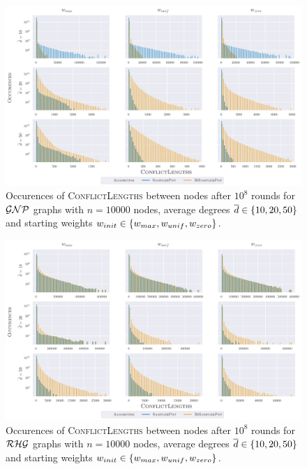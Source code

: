 \begin{figure}
  \centering
  \includegraphics[width=\textwidth]{Figures/experiments/NodeConflicts_Gnp.pdf}
  \caption{
    Occurences of \textsc{ConflictLengths} between nodes after $10^8$ rounds for $\mathcal{GNP}$ graphs with $n = 10000$ nodes, average degrees $\overline{d} \in \left\{10, 20, 50\right\}$ and starting weights $w_{init} \in \left\{w_{max}, w_{unif}, w_{zero}\right\}$.
  }
  \label{fig:app_node_conflicts_gnp}
\end{figure}

\begin{figure}
  \centering
  \includegraphics[width=\textwidth]{Figures/experiments/NodeConflicts_Rhg.pdf}
  \caption{
    Occurences of \textsc{ConflictLengths} between nodes after $10^8$ rounds for $\mathcal{RHG}$ graphs with $n = 10000$ nodes, average degrees $\overline{d} \in \left\{10, 20, 50\right\}$ and starting weights $w_{init} \in \left\{w_{max}, w_{unif}, w_{zero}\right\}$.
  }
  \label{fig:app_node_conflicts_rhg}
\end{figure}

